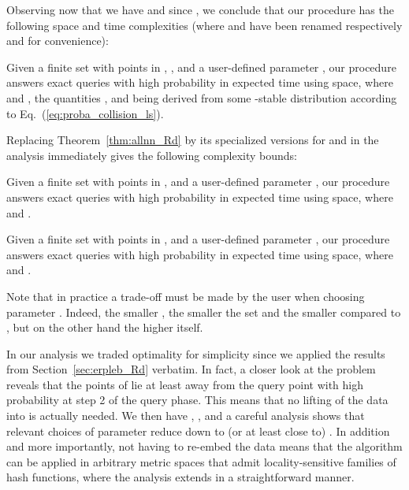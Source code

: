 Observing now that we have  and 
since , we conclude that our
procedure has the following space and time complexities (where 
and  have been renamed respectively  and  for
convenience):
\begin{thm}\label{thm:exact-nn}
  Given a finite set  with  points in , , and a user-defined parameter , our procedure
    answers exact \nn queries with high probability in expected
     time using  space, where  and ,
    the quantities ,  and
     being derived from some
    -stable distribution  according to
    Eq.~(\ref{eq:proba_collision_ls}).
\end{thm}
Replacing Theorem~\ref{thm:allnn_Rd} by its specialized versions for
 and  in the analysis immediately gives the following complexity
bounds:
\addtocounter{thm}{-1}
\begin{thm}[case ]\label{thm:exact-nn_l1}
  Given a finite set  with  points in , and a
  user-defined parameter , our procedure answers exact \nn
  queries with high probability in expected  time using  space, where  and .
\end{thm}
\addtocounter{thm}{-1}
\begin{thm}[case ]\label{thm:exact-nn_l2}
  Given a finite set  with  points in , and a
  user-defined parameter , our procedure answers exact \nn
  queries with high probability in expected  time using  space, where  and .
\end{thm}

Note that in practice a trade-off must be made by the user when
choosing parameter . Indeed, the smaller , the smaller
the set  and the smaller  compared to
, but on the other hand the higher  itself.

\begin{remark}\label{rem:exact-NN_general}
In our analysis we traded optimality for simplicity since we applied
the results from Section~\ref{sec:erpleb_Rd} verbatim. In fact, a
closer look at the problem reveals that the points of  lie at least
 away from the query point  with high
probability at step 2 of the query phase. This means that no
lifting of the data into  is actually needed. We then
have , , and a careful analysis shows that
relevant choices of parameter  reduce  down to (or at
least close to) . In addition and more importantly,
not having to re-embed the data means that the algorithm can be
applied in arbitrary metric spaces  that admit
locality-sensitive families of hash functions, where the analysis
extends in a straightforward manner.
\end{remark}



